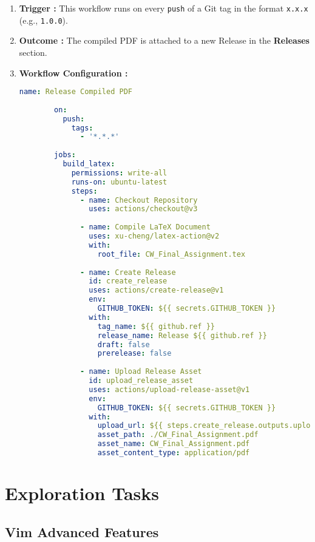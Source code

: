\documentclass[12pt]{article}
\begin{document}
\begin{enumerate}
    \item \textbf{Trigger :} This workflow runs on every \texttt{push} of a Git tag in the format \texttt{x.x.x} (e.g., \texttt{1.0.0}).
    \item \textbf{Outcome :} The compiled PDF is attached to a new Release in the \textbf{Releases} section.
    \item \textbf{Workflow Configuration :}
    \begin{lstlisting}[language=yaml, caption=Workflow for Major Releases]
        name: Release Compiled PDF
        
        on:
          push:
            tags:
              - '*.*.*'
        
        jobs:
          build_latex:
            permissions: write-all
            runs-on: ubuntu-latest
            steps:
              - name: Checkout Repository
                uses: actions/checkout@v3
        
              - name: Compile LaTeX Document
                uses: xu-cheng/latex-action@v2
                with:
                  root_file: CW_Final_Assignment.tex
        
              - name: Create Release
                id: create_release
                uses: actions/create-release@v1
                env:
                  GITHUB_TOKEN: ${{ secrets.GITHUB_TOKEN }}
                with:
                  tag_name: ${{ github.ref }}
                  release_name: Release ${{ github.ref }}
                  draft: false
                  prerelease: false
        
              - name: Upload Release Asset
                id: upload_release_asset
                uses: actions/upload-release-asset@v1
                env:
                  GITHUB_TOKEN: ${{ secrets.GITHUB_TOKEN }}
                with:
                  upload_url: ${{ steps.create_release.outputs.upload_url }}
                  asset_path: ./CW_Final_Assignment.pdf
                  asset_name: CW_Final_Assignment.pdf
                  asset_content_type: application/pdf
    \end{lstlisting}
        
\end{enumerate}

\section{Exploration Tasks}
    \subsection{Vim Advanced Features}
    
\end{document}
